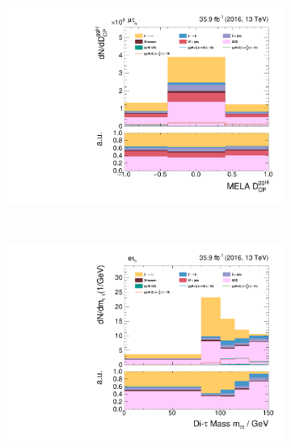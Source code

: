 \begin{figure}[h!]
\begin{subfigure}{.3\textwidth}
        \includegraphics[width=\textwidth]{Figures/eventselection/mt/dijet2D_lowboost/melaDiscriminatorDCPGGH.pdf}
    \end{subfigure} \\ %
    \begin{subfigure}{.3\textwidth}
        \centering
        \includegraphics[width=\textwidth]{Figures/eventselection/et/dijet2D_lowboost/m_sv.pdf}
    \end{subfigure}%
    \begin{subfigure}{.3\textwidth}
        \centering

\end{subfigure}
\end{figure}
